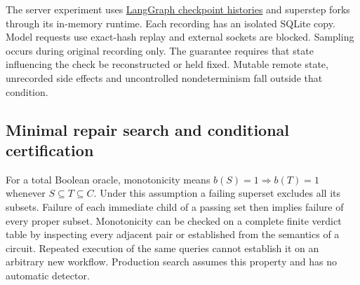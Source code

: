 \documentclass[11pt,letterpaper]{article}
\begin{document}
The server experiment uses \href{https://docs.langchain.com/oss/python/langgraph/use-time-travel}{LangGraph checkpoint histories} and superstep forks through its in-memory runtime. Each recording has an isolated SQLite copy. Model requests use exact-hash replay and external sockets are blocked. Sampling occurs during original recording only. The guarantee requires that state influencing the check be reconstructed or held fixed. Mutable remote state, unrecorded side effects and uncontrolled nondeterminism fall outside that condition.

\subsection{Minimal repair search and conditional certification}
For a total Boolean oracle, monotonicity means $b(S)=1\Rightarrow b(T)=1$ whenever $S\subseteq T\subseteq C$. Under this assumption a failing superset excludes all its subsets. Failure of each immediate child of a passing set then implies failure of every proper subset. Monotonicity can be checked on a complete finite verdict table by inspecting every adjacent pair or established from the semantics of a circuit. Repeated execution of the same queries cannot establish it on an arbitrary new workflow. Production search assumes this property and has no automatic detector.
\end{document}
